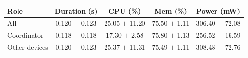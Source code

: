 \begin{tabular}{lcccc}
\hline
\textbf{Role} & \textbf{Duration (s)} & \textbf{CPU (\%)} & \textbf{Mem (\%)} & \textbf{Power (mW)} \\
\hline
All & 0.120 $\pm$ 0.023 & 25.05 $\pm$ 11.20 & 75.50 $\pm$ 1.11 & 306.40 $\pm$ 72.08 \\
Coordinator & 0.118 $\pm$ 0.018 & 17.30 $\pm$ 2.58 & 75.80 $\pm$ 1.13 & 256.52 $\pm$ 16.59 \\
Other devices & 0.120 $\pm$ 0.023 & 25.37 $\pm$ 11.31 & 75.49 $\pm$ 1.11 & 308.48 $\pm$ 72.76 \\
\hline
\end{tabular}
